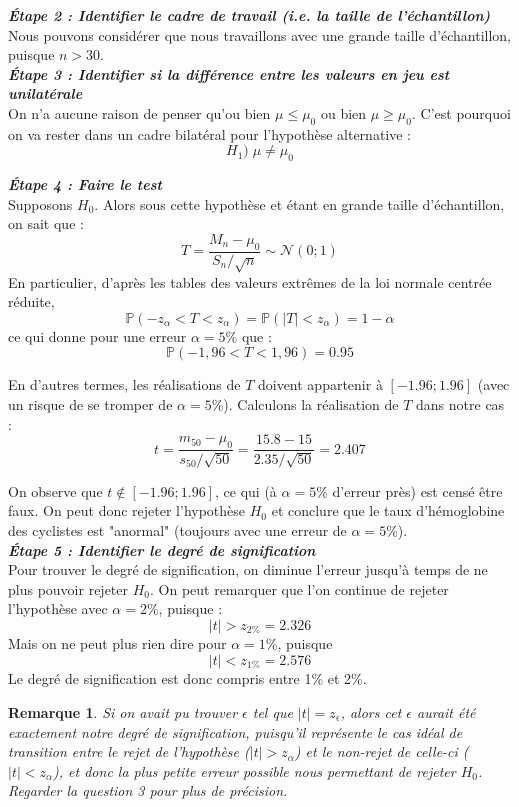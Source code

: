 \documentclass[a4paper,oneside,12pt]{article}
\theoremstyle{plain}
\newtheorem*{remark}{Remarque}
\def\P{{\mathbb P}}
\begin{document}
\textit{\textbf{Étape 2 : Identifier le cadre de travail (i.e. la taille de l'échantillon)}}\\
Nous pouvons considérer que nous travaillons avec une grande taille d'échantillon, puisque $n>30$.\\
    
\textit{\textbf{Étape 3 : Identifier si la différence entre les valeurs en jeu est unilatérale}}\\
On n'a aucune raison de penser qu'ou bien $\mu\le \mu_0$ ou bien $\mu\ge \mu_0$. C'est pourquoi on va rester dans un cadre bilatéral pour l'hypothèse alternative : $$H_1) \;\mu \neq \mu_0$$
    
\textit{\textbf{Étape 4 : Faire le test}}\\
Supposons $H_0$. Alors sous cette hypothèse et étant en grande taille d'échantillon, on sait que :
$$ T = \frac{M_n-\mu_0}{S_n/\sqrt{n}} \sim \mathcal{N}(0;1)$$
En particulier, d'après les tables des valeurs extrêmes de la loi normale centrée réduite, 
$$\P(-z_\alpha<T<z_\alpha) = \P(|T|<z_\alpha) = 1-\alpha$$
ce qui donne pour une erreur $\alpha = 5\%$ que :
$$\P(-1,96 < T < 1,96) = 0.95$$
    
En d'autres termes, les réalisations de $T$ doivent appartenir à $[-1.96;1.96]$ (avec un risque de se tromper de $\alpha = 5\%$). Calculons la réalisation de $T$ dans notre cas :
$$ t = \frac{m_{50}-\mu_0}{s_{50}/\sqrt{50}} =  \frac{15.8-15}{2.35/\sqrt{50}} = 2.407$$
    
On observe que $t\notin [-1.96;1.96]$, ce qui (à $\alpha = 5\%$ d'erreur près) est censé être faux. On peut donc rejeter l'hypothèse $H_0$ et conclure que le taux d'hémoglobine des cyclistes est "anormal" (toujours avec une erreur de $\alpha = 5\%$).\\
    
    
\textit{\textbf{Étape 5 : Identifier le degré de signification}}\\
Pour trouver le degré de signification, on diminue l'erreur jusqu'à temps de ne plus pouvoir rejeter $H_0$. On peut remarquer que l'on continue de rejeter l'hypothèse avec $\alpha = 2\%$, puisque : 
$$|t|> z_{2\%} = 2.326$$
Mais on ne peut plus rien dire pour $\alpha = 1\%$, puisque $$|t|< z_{1\%} = 2.576$$
Le degré de signification est donc compris entre 1\% et 2\%.
    
\begin{remark}
Si on avait pu trouver $\epsilon$ tel que $|t|= z_{\epsilon}$, alors cet $\epsilon$ aurait été exactement notre degré de signification, puisqu'il représente le cas idéal de transition entre le rejet de l'hypothèse ($|t|> z_{\alpha}$) et le non-rejet de celle-ci ($|t|< z_{\alpha}$), et donc la plus petite erreur possible nous permettant de rejeter $H_0$. Regarder la question 3 pour plus de précision.\\
\end{remark}
    
\end{document}
